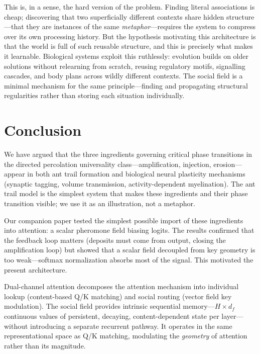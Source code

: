 \documentclass[11pt,a4paper]{article}
\begin{document}
This is, in a sense, the hard version of the problem.  Finding literal
associations is cheap; discovering that two superficially different
contexts share hidden structure---that they are instances of the same
\emph{metaphor}---requires the system to compress over its own
processing history.  But the hypothesis motivating this architecture is
that the world is full of such reusable structure, and this is precisely
what makes it learnable.  Biological systems exploit this ruthlessly:
evolution builds on older solutions without relearning from scratch,
reusing regulatory motifs, signalling cascades, and body plans across
wildly different contexts.  The social field is a minimal mechanism for
the same principle---finding and propagating structural regularities
rather than storing each situation individually.

\section{Conclusion}
\label{sec:conclusion}

We have argued that the three ingredients governing critical phase
transitions in the directed percolation universality
class---amplification, injection, erosion---appear in both ant trail
formation and biological neural plasticity mechanisms (synaptic
tagging, volume transmission, activity-dependent myelination).  The
ant trail model is the simplest system that makes these ingredients
and their phase transition visible; we use it as an illustration,
not a metaphor.

Our companion paper \cite{stigmergic2024} tested the simplest
possible import of these ingredients into attention: a scalar
pheromone field biasing logits.  The results confirmed that the
feedback loop matters (deposits must come from output, closing the
amplification loop) but showed that a scalar field decoupled from
key geometry is too weak---softmax normalization absorbs most of
the signal.  This motivated the present architecture.

Dual-channel attention decomposes the attention mechanism into
individual lookup (content-based Q/K matching) and social routing
(vector field key modulation).  The social field provides
intrinsic sequential memory---$H \times d_f$ continuous values of
persistent, decaying, content-dependent state per layer---without
introducing a separate recurrent pathway.  It operates in the same
representational space as Q/K matching, modulating the \emph{geometry}
of attention rather than its magnitude.
\end{document}
